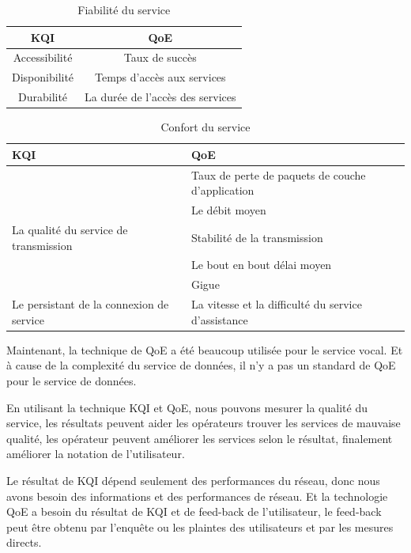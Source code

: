 \begin{table}[H]
	\centering
	\caption{Fiabilité du service }
	\label{table.fiabilité}
\begin{tabular}{|c|c|}
\hline \rule[-2ex]{0pt}{5.5ex} KQI & QoE \\ 
\hline \rule[-2ex]{0pt}{5.5ex} Accessibilité & Taux de succès  \\ 
\hline \rule[-2ex]{0pt}{5.5ex} Disponibilité  & Temps d'accès aux services \\ 
\hline \rule[-2ex]{0pt}{5.5ex} Durabilité & La durée de l'accès des services \\ 
\hline 
\end{tabular} 
\end{table}

\begin{table}[H]
	\centering
	\caption{Confort du service}
	\label{table.confort}
\begin{tabular}{|>{\centering\arraybackslash}p{5 cm}|>{\centering\arraybackslash}p{6 cm}|}
\hline KQI & QoE \\ 
\hline  & Taux de perte de paquets de couche d'application \\ 
\hline  & Le débit moyen  \newline \\ 
\hline La qualité du service de transmission & Stabilité de la transmission \\ 
\hline & Le bout en bout délai moyen \newline  \\ 
\hline & Gigue \newline  \\ 
\hline Le persistant de la connexion de service & La vitesse et la difficulté du service d'assistance\\ 
\hline 
\end{tabular} 
\end{table}

Maintenant, la technique de QoE a été beaucoup utilisée pour le service vocal. Et à cause de la complexité du service de données, il n'y a pas un standard de QoE pour le service de données. 

En utilisant la technique KQI et QoE, nous pouvons mesurer la qualité du service, les résultats peuvent aider les opérateurs trouver les services de mauvaise qualité, les opérateur peuvent améliorer les services selon le résultat, finalement améliorer la notation de l'utilisateur.  

Le résultat de KQI dépend seulement des performances du réseau, donc nous avons besoin des informations et des performances de réseau. Et la technologie QoE a besoin du résultat de KQI et de feed-back de l'utilisateur, le feed-back peut être obtenu par l'enquête ou les plaintes des utilisateurs et par les mesures directs.

